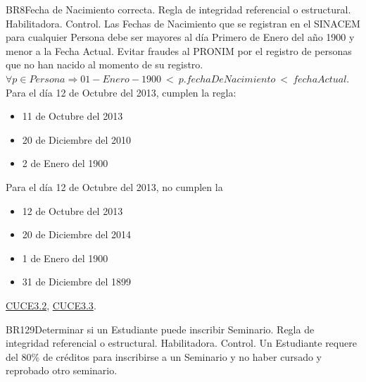 \begin{BussinesRule}{BR8}{Fecha de Nacimiento correcta.}
	\BRitem[Tipo:] Regla de integridad referencial o estructural.
	\BRitem[Clase:] Habilitadora.
	\BRitem[Nivel:] Control. %
	\BRitem[Descripción:]	Las Fechas de Nacimiento que se registran en el SINACEM para cualquier Persona debe ser mayores al día Primero de Enero del año 1900 y menor a la Fecha Actual.
	\BRitem[Motivación:] Evitar fraudes al PRONIM por el registro de personas que no han nacido al momento de su registro.
	\BRitem[Sentencia:] $\forall p \in Persona \Rightarrow 01-Enero-1900~<~p.fechaDeNacimiento~<~fechaActual$.
	 Para el día 12 de Octubre del 2013, cumplen la regla:
	\begin{itemize}
		\item 11 de Octubre del 2013
		\item 20 de Diciembre del 2010
		\item 2 de Enero del 1900
	\end{itemize}

	 Para el día 12 de Octubre del 2013, no cumplen la
	\begin{itemize}
		\item 12 de Octubre del 2013
		\item 20 de Diciembre del 2014
		\item 1 de Enero del 1900
		\item 31 de Diciembre del 1899
	\end{itemize}

	 \hyperlink{CUCE3.2}{CUCE3.2}, \hyperlink{CUCE3.3}{CUCE3.3}.
\end{BussinesRule}

\begin{BussinesRule}{BR129}{Determinar si un Estudiante puede inscribir Seminario.}
	\BRitem[Tipo:] Regla de integridad referencial o estructural.
	\BRitem[Clase:] Habilitadora.
	\BRitem[Nivel:] Control. %
	\BRitem[Descripción:] Un Estudiante requere del 80\% de créditos para inscribirse a un Seminario y no haber cursado y reprobado otro seminario.


\end{BussinesRule}

